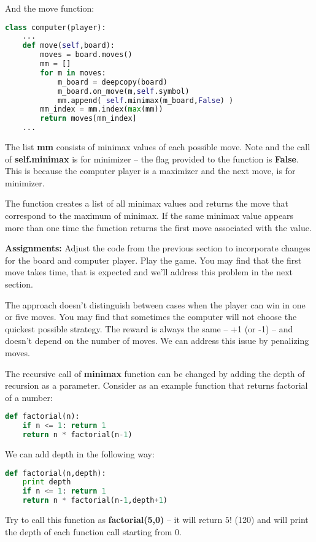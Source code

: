And the move function:
\begin{lstlisting}[language=Python,style=codelst2,caption={Tic-Tac-Toe: computer player, move funtion}]
class computer(player):
    ...
    def move(self,board):
        moves = board.moves()
        mm = []
        for m in moves:
            m_board = deepcopy(board)
            m_board.on_move(m,self.symbol)
            mm.append( self.minimax(m_board,False) )
        mm_index = mm.index(max(mm))
        return moves[mm_index]
    ...
\end{lstlisting}
The list \textbf{mm} consists of minimax values of each possible
move. Note and the call of \textbf{self.minimax} is for minimizer --
the flag provided to the function is \textbf{False}. This is because
the computer player is a maximizer and the next move, is for minimizer.

The function creates a list of all minimax values and returns the move
that correspond to the maximum of minimax. If the same minimax value 
appears more than one time the function returns the first move 
associated with the value. 


\begin{tcolorbox}
\textbf{Assignments:}
Adjust the code from the previous section to incorporate changes
for the board and computer player. Play the game. You may find that
the first move takes time, that is expected and we'll address this
problem in the next section.
\end{tcolorbox}

The approach doesn't distinguish between cases when the player can
win in one or five moves. You may find that sometimes the computer
will not choose the quickest possible strategy. The reward is always 
the same -- +1 (or -1) -- and doesn't depend on the number of moves.
We can address this issue by penalizing moves. 

The recursive call
of \textbf{minimax} function can be changed by adding the depth of
recursion as a parameter. Consider as an example function that
returns factorial of a number:


\begin{lstlisting}[language=Python,style=codelst2,caption={Factorial calculations}]
def factorial(n):
    if n <= 1: return 1
    return n * factorial(n-1)
\end{lstlisting}
We can add depth in the following way:
\begin{lstlisting}[language=Python,style=codelst2,caption={Factorial calculations with depth printing}]
def factorial(n,depth):
    print depth
    if n <= 1: return 1
    return n * factorial(n-1,depth+1)
\end{lstlisting}
Try to call this function as \textbf{factorial(5,0)} -- it will
return $5!$ (120) and will print the depth of each 
function call starting from 0.

